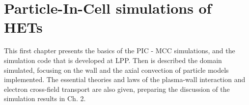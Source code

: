 
\chapter{Particle-In-Cell simulations of HETs}
\label{ch-1}

\begin{Chabstract}
  
This first chapter presents the basics of the \ac{PIC} - \ac{MCC} simulations, and the simulation code \LPPic that is developed at \ac{LPP}.
Then is described the domain simulated, focusing on the wall and the axial convection of particle models implemented.
The essential theories and laws of the plasma-wall interaction and electron cross-field transport are also given, preparing the discussion of the simulation results in Ch. 2.

\end{Chabstract}

\minitoc


 












